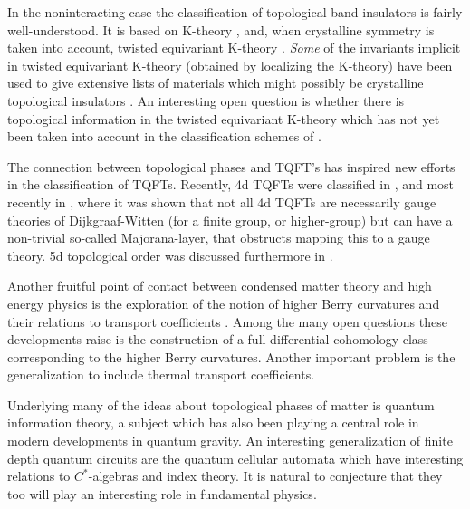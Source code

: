 \documentclass[12pt]{article}
\begin{document}
In the noninteracting case the classification of topological band 
insulators is fairly well-understood. It is based on K-theory 
\cite{Kitaev:2009mg,Schnyder:2008tya,Schnyder:2009klk,Ryu:2010zza}, 
and, when crystalline symmetry is taken into account, twisted 
equivariant K-theory \cite{Freed:2012uu,Kruthoff:2016ver,Stehouwer:2018xfs,Okuma:2018sfw}.
\emph{Some} of the invariants implicit in twisted equivariant K-theory (obtained by localizing the K-theory) have been used 
to give extensive lists of materials which might possibly be crystalline topological insulators 
\cite{VishwanathClassification1,VishwanathClassification2,BradlynCanoEtAl,BernevigClassification}. 
An interesting open question is whether there is topological information in the 
twisted equivariant K-theory which has not yet been taken into account in the classification 
schemes of 
\cite{VishwanathClassification1,VishwanathClassification2,BradlynCanoEtAl,BernevigClassification}.

The connection between topological phases and TQFT's has inspired new efforts in 
the classification of TQFTs. Recently, 4d TQFTs were classified in \cite{Lan:2018bui,Zhu:2018kzd,Lan:2018vjb, Johnson-Freyd:2020usu}, and most recently in \cite{TheoTBA}, where it was shown that not all 4d TQFTs are necessarily gauge theories of Dijkgraaf-Witten  (for a finite group, or higher-group) but can have a non-trivial so-called Majorana-layer, that obstructs mapping this to a gauge theory. 
5d topological order was discussed furthermore in \cite{Johnson-Freyd:2021tbq}.



Another fruitful point of contact between condensed matter theory
and high energy physics is the exploration of the notion of
higher Berry curvatures and their relations to transport coefficients
\cite{KitaevSPT,Hsin:2020cgg,Kapustin:2020eby,Kapustin:2020mkl,
Kapustin:2022apy}.
 Among the many open questions these developments raise is the
 construction of a full differential cohomology class corresponding 
 to the higher Berry curvatures. Another important problem is the 
 generalization to include thermal transport coefficients. 


Underlying many of the ideas about topological phases of matter
is quantum information theory, a subject which has also been
playing a central role in modern developments in quantum gravity.
An interesting generalization of finite depth quantum circuits are
the quantum cellular automata  \cite{Arrighi:2019uor,Farrelly:2019zds,Freedman:2019ucy}
which have interesting relations to $C^*$-algebras and index theory.
It is natural to conjecture that they too will play an interesting
role in fundamental physics.
\end{document}
